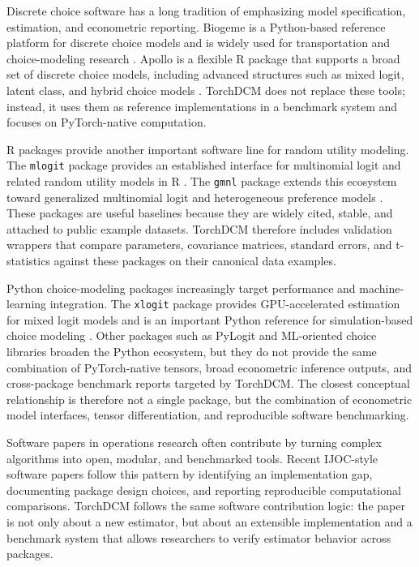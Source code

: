 Discrete choice software has a long tradition of emphasizing model specification, estimation, and econometric reporting.
Biogeme is a Python-based reference platform for discrete choice models and is widely used for transportation and choice-modeling research \citep{bierlaire2023biogeme}.
Apollo is a flexible R package that supports a broad set of discrete choice models, including advanced structures such as mixed logit, latent class, and hybrid choice models \citep{hess2019apollo}.
TorchDCM does not replace these tools; instead, it uses them as reference implementations in a benchmark system and focuses on PyTorch-native computation.

R packages provide another important software line for random utility modeling.
The \texttt{mlogit} package provides an established interface for multinomial logit and related random utility models in R \citep{croissant2020mlogit}.
The \texttt{gmnl} package extends this ecosystem toward generalized multinomial logit and heterogeneous preference models \citep{sarrias2017gmnl}.
These packages are useful baselines because they are widely cited, stable, and attached to public example datasets.
TorchDCM therefore includes validation wrappers that compare parameters, covariance matrices, standard errors, and t-statistics against these packages on their canonical data examples.

Python choice-modeling packages increasingly target performance and machine-learning integration.
The \texttt{xlogit} package provides GPU-accelerated estimation for mixed logit models and is an important Python reference for simulation-based choice modeling \citep{arteaga2022xlogit}.
Other packages such as PyLogit and ML-oriented choice libraries broaden the Python ecosystem, but they do not provide the same combination of PyTorch-native tensors, broad econometric inference outputs, and cross-package benchmark reports targeted by TorchDCM.
The closest conceptual relationship is therefore not a single package, but the combination of econometric model interfaces, tensor differentiation, and reproducible software benchmarking.

Software papers in operations research often contribute by turning complex algorithms into open, modular, and benchmarked tools.
Recent IJOC-style software papers follow this pattern by identifying an implementation gap, documenting package design choices, and reporting reproducible computational comparisons.
TorchDCM follows the same software contribution logic: the paper is not only about a new estimator, but about an extensible implementation and a benchmark system that allows researchers to verify estimator behavior across packages.
